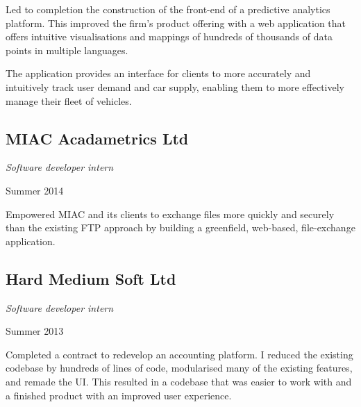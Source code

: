 Led to completion the construction of the front-end of a predictive analytics
platform. This improved the firm's product offering with a web application that
offers intuitive visualisations and mappings of hundreds of thousands of data
points in multiple languages.

The application provides an interface for clients to more accurately and
intuitively track user demand and car supply, enabling them to more effectively
manage their fleet of vehicles.

\subsection*{MIAC Acadametrics Ltd}
\noindent\begin{minipage}[b]{0.5\textwidth}
  \flushleft
  \emph{Software developer intern}
\end{minipage}
\noindent\begin{minipage}[b]{0.5\textwidth}
  \flushright
  Summer 2014
\end{minipage}

Empowered MIAC and its clients to exchange files more quickly and securely than
the existing FTP approach by building a greenfield, web-based, file-exchange
application.

\subsection*{Hard Medium Soft Ltd}
\noindent\begin{minipage}[b]{0.5\textwidth}
  \flushleft
  \emph{Software developer intern}
\end{minipage}
\noindent\begin{minipage}[b]{0.5\textwidth}
  \flushright
  Summer 2013
\end{minipage}

Completed a contract to redevelop an accounting platform. I reduced the existing
codebase by hundreds of lines of code, modularised many of the existing
features, and remade the UI. This resulted in a codebase that was easier to work
with and a finished product with an improved user experience.

